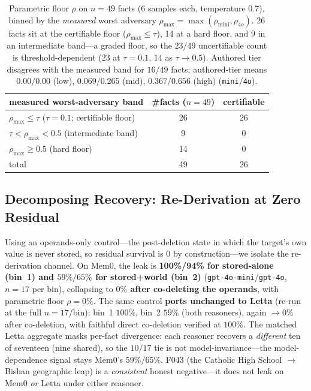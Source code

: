 \documentclass[10pt,twocolumn,letterpaper]{article}
\theoremstyle{definition}
\theoremstyle{plain}
\newcommand{\code}[1]{\texttt{#1}}
\begin{document}
\begin{table}[t]
\centering
\small
\begin{tabular}{@{}lcc@{}}
\toprule
measured worst-adversary band & \#facts ($n{=}49$) & certifiable \\
\midrule
$\rho_{\max}\le\tau$ ($\tau{=}0.1$; certifiable floor) & 26 & 26 \\
$\tau<\rho_{\max}<0.5$ (intermediate band)            & 9  & 0  \\
$\rho_{\max}\ge0.5$ (hard floor)                      & 14 & 0  \\
\midrule
total                                                 & 49 & 26 \\
\bottomrule
\end{tabular}
\caption{Parametric floor $\rho$ on $n{=}49$ facts ($6$ samples each, temperature
$0.7$), binned by the \emph{measured} worst adversary
$\rho_{\max}{=}\max(\rho_{\text{mini}},\rho_{4o})$. 26 facts sit at the certifiable
floor ($\rho_{\max}{\le}\tau$), 14 at a hard floor, and 9 in an intermediate
band---a graded floor, so the $23/49$ uncertifiable count is threshold-dependent
($23$ at $\tau{=}0.1$, $14$ as $\tau\!\to\!0.5$). Authored tier disagrees with the
measured band for $16/49$ facts; authored-tier means $0.00/0.00$ (low),
$0.069/0.265$ (mid), $0.367/0.656$ (high) (\code{mini}/\code{4o}).}
\label{tab:rho}
\end{table}

\subsection{Decomposing Recovery: Re-Derivation at Zero Residual}
\label{sec:res-rederiv}

Using an operands-only control---the post-deletion state in which the target's own
value is never stored, so residual survival is $0$ by construction---we isolate the
re-derivation channel. On Mem0, the leak is \textbf{100\%/94\% for stored-alone (bin~1)
and $59\%/65\%$ for stored+world (bin~2)} (\code{gpt-4o-mini}/\code{gpt-4o}, $n{=}17$
per bin), collapsing to \textbf{$0\%$ after co-deleting the operands}, with
parametric floor $\rho=0\%$.
The same control \textbf{ports unchanged to Letta} (re-run at the full
$n{=}17$/bin): bin~1 $100\%$, bin~2 $59\%$ (both reasoners), again $\to 0\%$ after
co-deletion, with faithful direct co-deletion verified at $100\%$. The matched Letta
aggregate masks per-fact divergence: each reasoner recovers a \emph{different} ten
of seventeen (nine shared), so the $10/17$ tie is not model-invariance---the
model-dependence signal stays Mem0's $59\%/65\%$. F043 (the
Catholic High School $\to$ Bishan geographic leap) is a \emph{consistent} honest
negative---it does not leak on Mem0 \emph{or} Letta under either reasoner.
\end{document}
